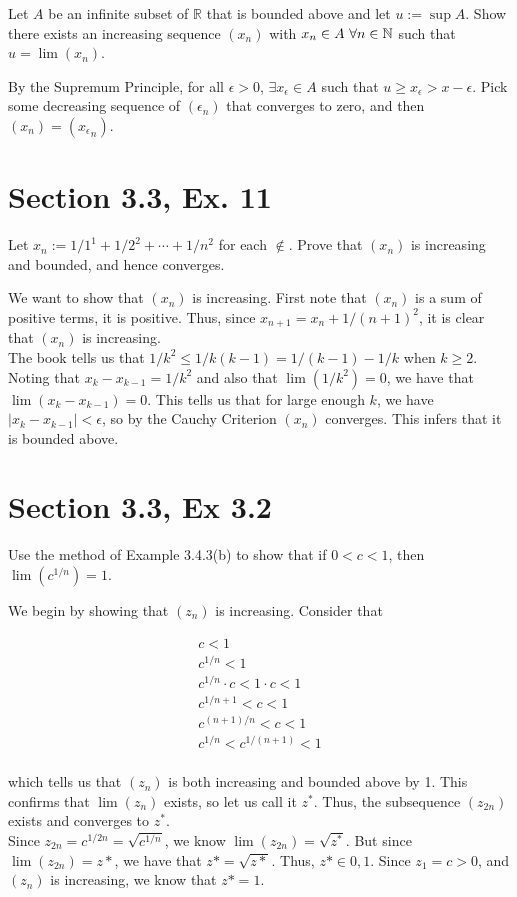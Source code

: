 \documentclass[paper=a4, fontsize=11pt]{scrartcl} %
\numberwithin{equation}{section} %
\numberwithin{figure}{section} %
\numberwithin{table}{section} %
\begin{document}
Let $A$ be an infinite subset of $\mathbb{R}$ that is bounded above and let $u := \sup A$. Show there exists an increasing sequence $(x_n)$ with $x_n \in A ~ \forall n \in \mathbb{N}$ such that $u = \lim(x_n)$.

\pf By the Supremum Principle, for all $\epsilon > 0$, $\exists x_\epsilon \in A$ such that $u \geq x_\epsilon > x - \epsilon$. Pick some decreasing sequence of $(\epsilon_n)$ that converges to zero, and then $(x_n) = ({x_\epsilon}_n)$. \done

\section*{Section 3.3, Ex. 11}

Let $x_n := 1/1^1 + 1/2^2 + \cdots + 1/n^2$ for each $\nin$. Prove that $(x_n)$ is increasing and bounded, and hence converges.

\pf We want to show that $(x_n)$ is increasing. First note that $(x_n)$ is a sum of positive terms, it is positive. Thus, since $x_{n+1} = x_n + 1/(n+1)^2$, it is clear that $(x_n)$ is increasing.\\

The book tells us that $1/k^2 \leq 1/k(k-1) = 1/(k-1) - 1/k$ when $k \geq 2$. Noting that $x_k - x_{k-1} = 1/k^2$ and also that $\lim(1/k^2) = 0$, we have that $\lim(x_k - x_{k-1}) = 0$. This tells us that for large enough $k$, we have $|x_k - x_{k-1}| < \epsilon$, so by the Cauchy Criterion $(x_n)$ converges. This infers that it is bounded above. \done

\section*{Section 3.3, Ex 3.2}

Use the method of Example 3.4.3(b) to show that if $0 < c < 1$, then $\lim(c^{1/n}) = 1$.

\pf We begin by showing that $(z_n)$ is increasing. Consider that

\begin{gather*}
c < 1\\
c^{1/n} < 1\\
c^{1/n} \cdot c < 1 \cdot c < 1\\
c^{1/n + 1} < c < 1\\
c^{(n + 1)/n} < c < 1\\
c^{1/n} < c^{1/(n+1)} < 1\\
\end{gather*}

which tells us that $(z_n)$ is both increasing and bounded above by 1. This confirms that $\lim(z_n)$ exists, so let us call it $z^*$. Thus, the subsequence $(z_{2n})$ exists and converges to $z^*$.\\

Since $z_{2n} = c^{1/2n} = \sqrt{c^{1/n}}$, we know $\lim(z_{2n}) = \sqrt{z^*}$. But since $\lim(z_{2n}) = z*$,  we have that $z* = \sqrt{z*}$. Thus, $z* \in {0,1}$. Since $z_1 = c > 0$, and $(z_n)$ is increasing, we know that $z* = 1$. \done
\end{document}
